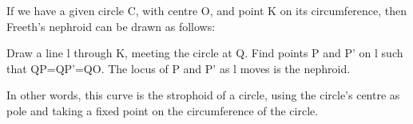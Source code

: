 If we have a given circle C, with centre O, and point K on its circumference, 
then Freeth's nephroid can be drawn as follows:
\par
Draw a line l through K, meeting the circle at Q. 
Find points P and P' on l such that QP=QP'=QO. The locus of 
P and P' as l moves is the nephroid.
\par
In other words, this curve is the strophoid of a circle, using the circle's
centre as pole and taking a fixed point on the circumference of the
circle.
